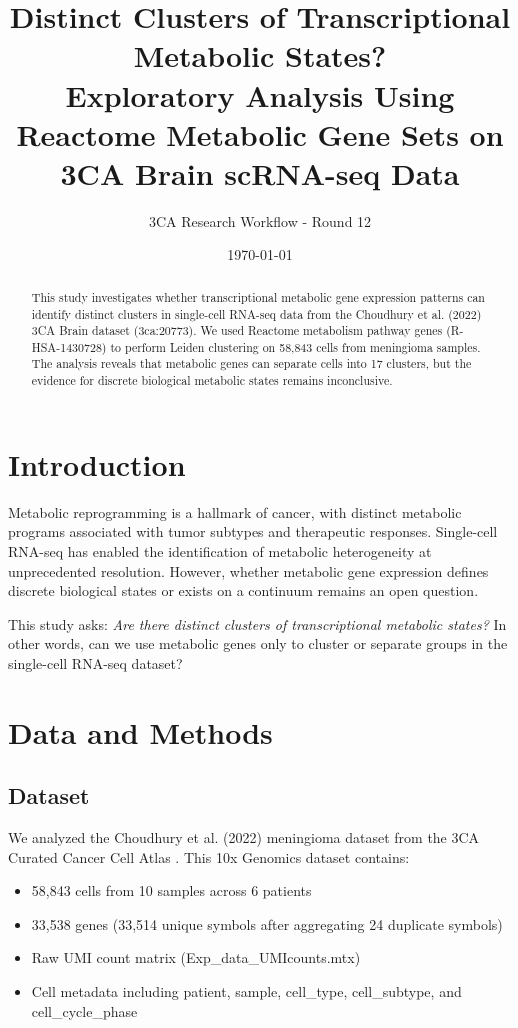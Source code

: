 \documentclass[12pt, a4paper]{article}
\title{\textbf{Distinct Clusters of Transcriptional Metabolic States?} \\
Exploratory Analysis Using Reactome Metabolic Gene Sets on 3CA Brain scRNA-seq Data}
\author{3CA Research Workflow - Round 12}
\date{\today}
\begin{document}
\maketitle

\begin{abstract}
This study investigates whether transcriptional metabolic gene expression patterns can identify distinct clusters in single-cell RNA-seq data from the Choudhury et al. (2022) 3CA Brain dataset (3ca:20773). We used Reactome metabolism pathway genes (R-HSA-1430728) to perform Leiden clustering on 58,843 cells from meningioma samples. The analysis reveals that metabolic genes can separate cells into 17 clusters, but the evidence for discrete biological metabolic states remains inconclusive.
\end{abstract}

\section{Introduction}
Metabolic reprogramming is a hallmark of cancer, with distinct metabolic programs associated with tumor subtypes and therapeutic responses. Single-cell RNA-seq has enabled the identification of metabolic heterogeneity at unprecedented resolution. However, whether metabolic gene expression defines discrete biological states or exists on a continuum remains an open question.

This study asks: \textit{Are there distinct clusters of transcriptional metabolic states?} In other words, can we use metabolic genes only to cluster or separate groups in the single-cell RNA-seq dataset?

\section{Data and Methods}

\subsection{Dataset}
We analyzed the Choudhury et al. (2022) meningioma dataset from the 3CA Curated Cancer Cell Atlas \citep{choudhury2022}. This 10x Genomics dataset contains:
\begin{itemize}
    \item 58,843 cells from 10 samples across 6 patients
    \item 33,538 genes (33,514 unique symbols after aggregating 24 duplicate symbols)
    \item Raw UMI count matrix (Exp_data_UMIcounts.mtx)
    \item Cell metadata including patient, sample, cell_type, cell_subtype, and cell_cycle_phase
\end{itemize}
\end{document}
